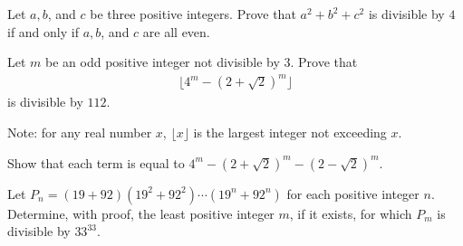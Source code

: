 \documentclass{subfile}
\begin{document}
	\begin{problem}[Slovenia 2010]
		Let $a,b$, and $c$ be three positive integers. Prove that $a^2+b^2+c^2$ is divisible by $4$ if and only if $a,b$, and $c$ are all even. %
	\end{problem}

%

	\begin{problem}
		Let $m$ be an odd positive integer not divisible by $3$. Prove that
			\begin{align*}
				\big\lfloor 4^m -(2+\sqrt 2)^m \big\rfloor
			\end{align*}
		is divisible by $112.$ %

		Note: for any real number $x$, $\lfloor x \rfloor$ is the largest integer not exceeding $x$.
	\end{problem}

	\begin{hint}
		Show that each term is equal to $4^m-(2+\sqrt 2)^m-(2-\sqrt 2)^m$.
	\end{hint}

%

	\begin{problem}
		Let $P_n = (19 + 92)(19^2 +92^2) \cdots(19^n +92^n)$ for each positive integer $n$. Determine, with proof, the least positive integer $m$, if it exists, for which $P_m$ is divisible by $33^{33}.$ %
	\end{problem}
\end{document}
